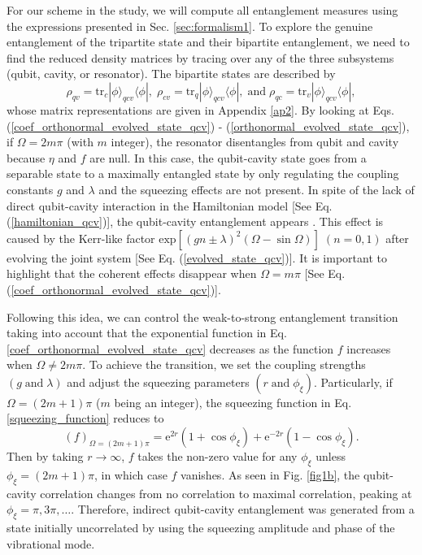 For our scheme in the study, we will compute all entanglement measures using the expressions presented in Sec. \ref{sec:formalism1}. To explore the genuine entanglement of the tripartite state and their bipartite entanglement, we need to find the reduced density matrices by tracing over any of the three subsystems (qubit, cavity, or resonator). The bipartite states are described by
\begin{equation}\label{state_bipartite_system}
\rho_{qv}=\textrm{tr}_{c}|\phi\rangle_{qcv}\langle \phi|,\; \rho_{cv}=\textrm{tr}_{q}|\phi\rangle_{qcv}\langle \phi|,\; \text{and}\; \rho_{qc}=\textrm{tr}_{v}|\phi\rangle_{qcv}\langle \phi|,
\end{equation}
whose matrix representations are given in Appendix \ref{ap2}. By looking at Eqs. (\ref{coef_orthonormal_evolved_state_qcv}) - (\ref{orthonormal_evolved_state_qcv}), if $\Omega=2m\pi$ (with $m$ integer), the resonator disentangles from qubit and cavity because $\eta$ and $f$ are null. In this case, the qubit-cavity state goes from a separable state to a maximally entangled state by only regulating the coupling constants $g$ and $\lambda$ and the squeezing effects are not present. In spite of the lack of direct qubit-cavity interaction in the Hamiltonian model [See Eq. (\ref{hamiltonian_qcv})], the qubit-cavity entanglement appears \citep{montenegro2019mechanical}. This effect is caused by the Kerr-like factor $\textrm{exp}\left[\left(gn\pm \lambda\right)^{2}\left(\Omega-\sin\Omega\right)\right]\;(n=0, 1)$ after evolving the joint system [See Eq. (\ref{evolved_state_qcv})]. It is important to highlight that the coherent effects disappear when $\Omega=m\pi$ [See Eq. (\ref{coef_orthonormal_evolved_state_qcv})].

Following this idea, we can control the weak-to-strong entanglement transition taking into account that the exponential function in Eq. \eqref{coef_orthonormal_evolved_state_qcv} decreases as the function $f$ increases when $\Omega \neq 2m\pi$. To achieve the transition, we set the coupling strengths $(g\; \text{and}\; \lambda)$ and adjust the squeezing parameters $\left(r\; \text{and} \;\phi_{\xi}\right)$. Particularly, if $\Omega=(2m+1)\pi$ ($m$ being an integer), the squeezing function in Eq. \eqref{squeezing_function} reduces to
\begin{equation}
(f)_{\Omega=(2m+1)\pi}=\textrm{e}^{2r}\left(1+\cos\phi_{\xi}\right)+\textrm{e}^{-2r}\left(1-\cos\phi_{\xi}\right).
\end{equation}
Then by taking $r\rightarrow \infty$, $f$ takes the non-zero value for any $\phi_{\xi}$ unless $\phi_{\xi}=(2m+1)\pi$, in which case $f$ vanishes. As seen in Fig. \ref{fig1b}, the qubit-cavity correlation changes from no correlation to maximal correlation, peaking at $\phi_{\xi}=\pi, 3\pi, \ldots$. Therefore, indirect qubit-cavity entanglement was generated from a state initially uncorrelated by using the squeezing amplitude and phase of the vibrational mode. 

